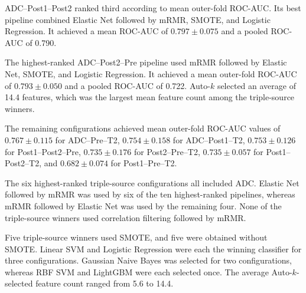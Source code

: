 \documentclass[12pt,twocolumn]{article}
\begin{document}
ADC--Post1--Post2 ranked third according to mean outer-fold
ROC-AUC. Its best pipeline combined Elastic Net followed by mRMR,
SMOTE, and Logistic Regression. It achieved a mean ROC-AUC of
\(0.797 \pm 0.075\) and a pooled ROC-AUC of 0.790.

The highest-ranked ADC--Post2--Pre pipeline used mRMR followed by
Elastic Net, SMOTE, and Logistic Regression. It achieved a mean
outer-fold ROC-AUC of \(0.793 \pm 0.050\) and a pooled ROC-AUC of
0.722. Auto-\(k\) selected an average of 14.4 features, which was
the largest mean feature count among the triple-source winners.

The remaining configurations achieved mean outer-fold ROC-AUC values
of \(0.767 \pm 0.115\) for ADC--Pre--T2,
\(0.754 \pm 0.158\) for ADC--Post1--T2,
\(0.753 \pm 0.126\) for Post1--Post2--Pre,
\(0.735 \pm 0.176\) for Post2--Pre--T2,
\(0.735 \pm 0.057\) for Post1--Post2--T2, and
\(0.682 \pm 0.074\) for Post1--Pre--T2.

The six highest-ranked triple-source configurations all included ADC.
Elastic Net followed by mRMR was used by six of the ten
highest-ranked pipelines, whereas mRMR followed by Elastic Net was
used by the remaining four. None of the triple-source winners used
correlation filtering followed by mRMR.

Five triple-source winners used SMOTE, and five were obtained without
SMOTE. Linear SVM and Logistic Regression were each the winning
classifier for three configurations. Gaussian Naive Bayes was selected
for two configurations, whereas RBF SVM and LightGBM were each
selected once. The average Auto-\(k\)-selected feature count ranged
from 5.6 to 14.4.
\end{document}
